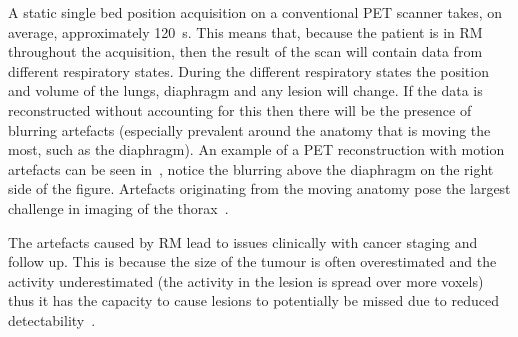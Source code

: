             A static single bed position acquisition on a conventional \gls{PET} scanner takes, on average, approximately \SI{120}{\second}. This means that, because the patient is in \gls{RM} throughout the acquisition, then the result of the scan will contain data from different respiratory states. During the different respiratory states the position and volume of the lungs, diaphragm and any lesion will change. If the data is reconstructed without accounting for this then there will be the presence of blurring artefacts (especially prevalent around the anatomy that is moving the most, such as the diaphragm). %
            An example of a \gls{PET} reconstruction with motion artefacts can be seen in~, notice the blurring above the diaphragm on the right side of the figure. Artefacts originating from the moving anatomy pose the largest challenge in imaging of the thorax~\parencite{LungMotionArtefactBib, PETCTArtifactBib}.
            
            The artefacts caused by \gls{RM} lead to issues clinically with cancer staging and follow up. This is because the size of the tumour is often overestimated and the activity underestimated (the activity in the lesion is spread over more voxels) thus it has the capacity to cause lesions to potentially be missed due to reduced detectability~\parencite{LungMotionJudgmentErrorsBib}. %
            
